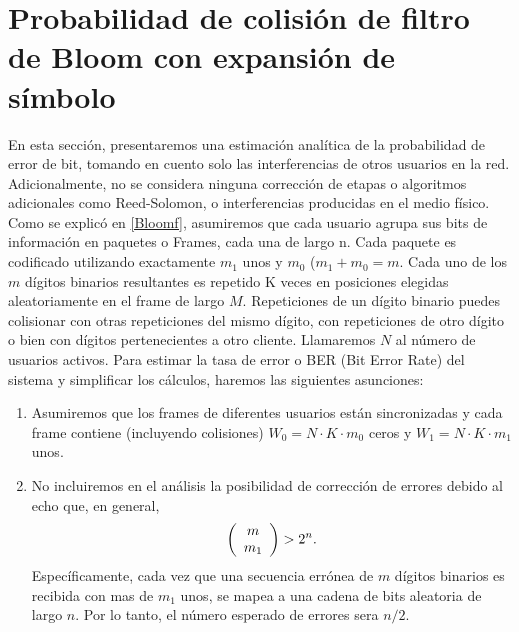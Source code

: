 \section{Probabilidad de colisión de filtro de Bloom con expansión de símbolo}

En esta sección, presentaremos una estimación analítica de la probabilidad de error de bit, tomando en cuento solo las interferencias de otros usuarios en la red.
Adicionalmente, no se considera ninguna corrección de etapas o algoritmos adicionales como Reed-Solomon, o interferencias producidas en el medio físico.
Como se explicó en \ref{Bloomf}, asumiremos que cada usuario agrupa sus bits de información en paquetes o Frames, cada una de largo n. Cada paquete es codificado utilizando exactamente $m_{1}$ unos y $m_{0}$ ($m_{1}+m_{0}=m$. Cada uno de los $m$ dígitos binarios resultantes es repetido K veces en posiciones elegidas aleatoriamente en el frame de largo $M$. Repeticiones de un dígito binario puedes colisionar con otras repeticiones del mismo dígito, con repeticiones de otro dígito o bien con dígitos pertenecientes a otro cliente.
Llamaremos $N$ al número de usuarios activos. Para estimar la tasa de error o BER (Bit Error Rate) del sistema y simplificar los cálculos, haremos las siguientes asunciones:

\begin{enumerate}
 \item Asumiremos que los frames de diferentes usuarios están sincronizadas y cada frame contiene (incluyendo colisiones) $W_0 = N\cdot K\cdot m_0$ ceros y $W_1 = N\cdot K\cdot m_1$ unos.
 \item No incluiremos en el análisis la posibilidad de corrección de errores debido al echo que, en general, 
 \begin{equation}
\left(\begin{array}{c} m \\ m_1\end{array}\right) > 2^n.
\end{equation}
Específicamente, cada vez que una secuencia errónea de $m$ dígitos binarios es recibida con mas de $m_1$ unos, se mapea a una cadena de bits aleatoria de largo $n$.
Por lo tanto, el número esperado de errores sera $n/2$.
\end{enumerate}

